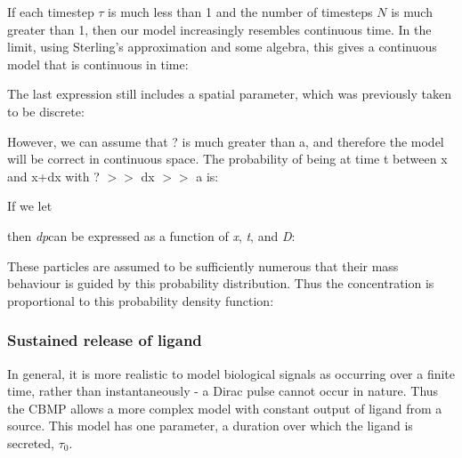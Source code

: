 \documentclass[11.5pt]{article}
\begin{document}
If each timestep \(\tau\) is much less than 1 and the number of 
timesteps \(N\) is much greater than 1, then our model increasingly 
resembles continuous time. In the limit, using Sterling's approximation 
and some algebra, this gives a continuous model that is continuous in 
time:





The last expression still includes a spatial parameter, which was 
previously taken to be discrete: 

\begin{figure}[H]
\centering
\end{figure}




However, we can assume that ? is much greater than a, and therefore the 
model will be correct in continuous space. The probability of being at 
time t between x and x+dx with ? $>$$>$ dx $>$$>$ a is:

\begin{figure}[H]
\centering
\end{figure}




If we let

\begin{figure}[H]
\centering
\end{figure}


then {\itshape dp}can be expressed as a function of {\itshape x}, 
{\itshape t}, and {\itshape D}:

\begin{figure}[H]
\centering
\end{figure}


These particles are assumed to be sufficiently numerous that their mass 
behaviour is guided by this probability distribution. Thus the 
concentration is proportional to this probability density function:

\begin{figure}[H]
\centering
\end{figure}


\subsubsection{Sustained release of 
ligand}
In general, it is more realistic to model biological signals as 
occurring over a finite time, rather than instantaneously - a Dirac 
pulse cannot occur in nature. Thus the CBMP allows a more complex model 
with constant output of ligand from a source. This model has one 
parameter, a duration over which the ligand is secreted, \(\tau
_0\).
\end{document}
